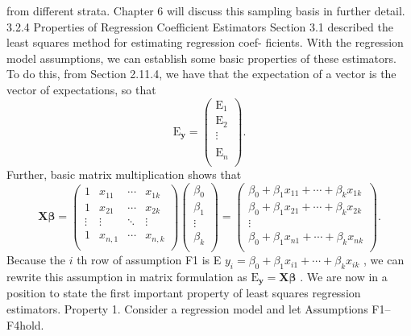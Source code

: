 \documentclass[11pt]{article}
\begin{document}
 from different strata. Chapter \(6\) will discuss this sampling basis in further detail.
3.2.4 Properties of Regression Coefficient Estimators
Section 3.1 described the least squares method for estimating regression coef-
ficients. With the regression model assumptions, we can establish some basic
properties of these estimators. To do this, from Section 2.11.4, we have that the
expectation of a vector is the vector of expectations, so that
\[
\textrm{E}_{\mathbf{y}}=\left( \begin{matrix} {\textrm{E}_{1}} \\ {\textrm{E}_{2}} \\ {\vdots_{\phantom{\Big|}}} \\ {\textrm{E}_{n}} \\ \end{matrix} \right) .
\]
Further, basic matrix multiplication shows that
\[
\mathbf{X} \boldsymbol{\beta}=\left( \begin{matrix} {1} & {x_{1 1}} & {\cdots} & {x_{1 k}} \\ {1} & {x_{2 1}} & {\cdots} & {x_{2 k}} \\ {\vdots} & {\vdots} & {\ddots} & {\vdots} \\ {1} & {x_{n , 1}} & {\cdots} & {x_{n , k}} \\ \end{matrix} \right) \left( \begin{matrix} {\beta_{0}} \\ {\beta_{1}} \\ {\vdots} \\ {\beta_{k}} \\ \end{matrix} \right)=\left( \begin{matrix} {\beta_{0}+\beta_{1} x_{1 1}+\cdots+\beta_{k} x_{1 k}} \\ {\beta_{0}+\beta_{1} x_{2 1}+\cdots+\beta_{k} x_{2 k}} \\ {\vdots} \\ {\beta_{0}+\beta_{1} x_{n 1}+\cdots+\beta_{k} x_{n k}} \\ \end{matrix} \right) .
\]
Because the \(i\) th row of assumption F1 is E \(y_{i}=\beta_{0}+\beta_{1} x_{i 1}+\cdots+\beta_{k} x_{i k}\) , we
can rewrite this assumption in matrix formulation as \(\textrm{E}_{\mathbf{y}}=\mathbf{X} \boldsymbol{\beta}\) . We are now in a
 position to state the first important property of least squares regression estimators.
Property 1. Consider a regression model and let Assumptions F1--F4hold.
\end{document}
